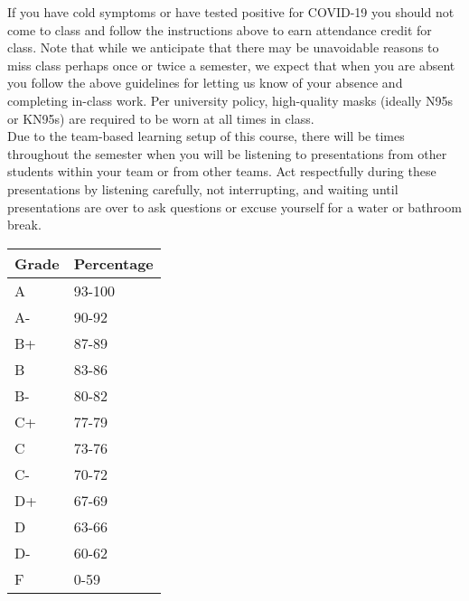 \documentclass[10pt]{article}
\begin{document}
 If you have cold symptoms or have tested positive for COVID-19 you should not come to class and follow the instructions above to earn attendance credit for class. Note that while we anticipate that there may be unavoidable reasons to miss class perhaps once or twice a semester, we expect that when you are absent you follow the above guidelines for letting us know of your absence and completing in-class work. Per university policy, high-quality masks (ideally N95s or KN95s) are required to be worn at all times in class.  \\


 Due to the team-based learning setup of this course, there will be times throughout the semester when you will be listening to presentations from other students within your team or from other teams. Act respectfully during these presentations by listening carefully, not interrupting, and waiting until presentations are over to ask questions or excuse yourself for a water or bathroom break.\\

%
%
\begin{table}[htp]
\begin{tabular}{ll}
Grade & Percentage \\
\hline
A & 93-100 \\
A- & 90-92 \\
B+ & 87-89 \\
B & 83-86 \\
B- & 80-82 \\
C+ & 77-79 \\
C & 73-76 \\
C- & 70-72 \\
D+ & 67-69 \\
D & 63-66 \\
D- & 60-62\\
F & 0-59 \\
\end{tabular}
\end{table}%
\end{document}
